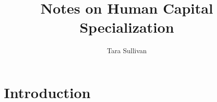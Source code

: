 \documentclass[10 pt]{article}
\begin{document}
\title{Notes on Human Capital Specialization}
\author{Tara Sullivan}

\maketitle
\onehalfspacing

\noindent{}

\section{Introduction}

\begin{outline}

\item \textcite{AF20}

\end{outline}

\printbibliography
\end{document}
